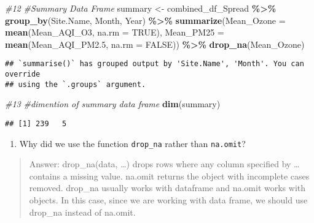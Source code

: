 \documentclass[
]{article}
\newenvironment{Shaded}{\begin{snugshade}}{\end{snugshade}}
\newcommand{\AttributeTok}[1]{\textcolor[rgb]{0.13,0.29,0.53}{#1}}
\newcommand{\CommentTok}[1]{\textcolor[rgb]{0.56,0.35,0.01}{\textit{#1}}}
\newcommand{\ConstantTok}[1]{\textcolor[rgb]{0.56,0.35,0.01}{#1}}
\newcommand{\FloatTok}[1]{\textcolor[rgb]{0.00,0.00,0.81}{#1}}
\newcommand{\FunctionTok}[1]{\textcolor[rgb]{0.13,0.29,0.53}{\textbf{#1}}}
\newcommand{\NormalTok}[1]{#1}
\newcommand{\OtherTok}[1]{\textcolor[rgb]{0.56,0.35,0.01}{#1}}
\newcommand{\SpecialCharTok}[1]{\textcolor[rgb]{0.81,0.36,0.00}{\textbf{#1}}}
\providecommand{\tightlist}{%
  \setlength{\itemsep}{0pt}\setlength{\parskip}{0pt}}
\begin{document}
\begin{Shaded}
\begin{Highlighting}[]
\CommentTok{\#12}
\CommentTok{\#Summary Data Frame}
\NormalTok{summary }\OtherTok{\textless{}{-}}\NormalTok{ combined\_df\_Spread }\SpecialCharTok{\%\textgreater{}\%}
  \FunctionTok{group\_by}\NormalTok{(Site.Name, Month, Year) }\SpecialCharTok{\%\textgreater{}\%}
  \FunctionTok{summarize}\NormalTok{(}\AttributeTok{Mean\_Ozone =} \FunctionTok{mean}\NormalTok{(Mean\_AQI\_O3, }\AttributeTok{na.rm =} \ConstantTok{TRUE}\NormalTok{),}
            \AttributeTok{Mean\_PM25 =} \FunctionTok{mean}\NormalTok{(Mean\_AQI\_PM2}\FloatTok{.5}\NormalTok{, }\AttributeTok{na.rm =} \ConstantTok{FALSE}\NormalTok{)) }\SpecialCharTok{\%\textgreater{}\%}
  \FunctionTok{drop\_na}\NormalTok{(Mean\_Ozone)}
\end{Highlighting}
\end{Shaded}

\begin{verbatim}
## `summarise()` has grouped output by 'Site.Name', 'Month'. You can override
## using the `.groups` argument.
\end{verbatim}

\begin{Shaded}
\begin{Highlighting}[]
\CommentTok{\#13}
\CommentTok{\#dimention of summary data frame}
\FunctionTok{dim}\NormalTok{(summary)}
\end{Highlighting}
\end{Shaded}

\begin{verbatim}
## [1] 239   5
\end{verbatim}

\begin{enumerate}
\def\labelenumi{\arabic{enumi}.}
\setcounter{enumi}{13}
\tightlist
\item
  Why did we use the function \texttt{drop\_na} rather than
  \texttt{na.omit}?
\end{enumerate}

\begin{quote}
Answer: drop\_na(data, \ldots) drops rows where any column specified by
\ldots{} contains a missing value. na.omit returns the object with
incomplete cases removed. drop\_na usually works with dataframe and
na.omit works with objects. In this case, since we are working with data
frame, we should use drop\_na instead of na.omit.
\end{quote}
\end{document}
